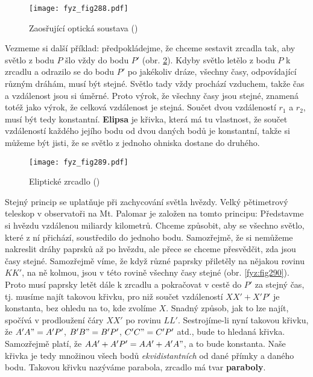     \begin{figure}[ht!] %
      \centering
      \texttt{[image: fyz\_fig288.pdf]}
      \caption{Zaosřující optická soustava
               (\cite[s.~351]{Feynman01})}
      \label{fyz:fig288}
    \end{figure}

    Vezmeme si další příklad: předpokládejme, že chceme sestavit zrcadla tak, aby světlo z bodu 
    \(P\) šlo vždy do bodu \(P'\) (obr. \ref{fyz:fig289}). Kdyby světlo letělo z bodu \(P\) k 
    zrcadlu a odrazilo se do bodu \(P'\) po jakékoliv dráze, všechny časy, odpovídající různým 
    dráhám, musí být stejné. Světlo tady vždy prochází vzduchem, takže čas a vzdálenost jsou si 
    úměrné. Proto výrok, že všechny časy jsou stejné, znamená totéž jako výrok, že celková 
    vzdálenost je stejná. Součet dvou vzdáleností \(r_1\) a \(r_2\), musí být tedy konstantní. 
    \textbf{Elipsa} je křivka, která má tu vlastnost, že součet vzdáleností každého jejího bodu od 
    dvou daných bodů je konstantní, takže si můžeme být jisti, že se světlo z jednoho ohniska 
    dostane do druhého.
    
    \begin{figure}[ht!] %
      \centering
      \texttt{[image: fyz\_fig289.pdf]}
      \caption{Eliptické zrcadlo
               (\cite[s.~351]{Feynman01})}
      \label{fyz:fig289}
    \end{figure}

    Stejný princip se uplatňuje při zachycování světla hvězdy. Velký pětimetrový teleskop v 
    observatoři na Mt. Palomar je založen na tomto principu: Představme si hvězdu vzdálenou 
    miliardy kilometrů. Chceme způsobit, aby se všechno světlo, které z ní přichází, soustředilo do 
    jednoho bodu. Samozřejmě, že si nemůžeme nakreslit dráhy paprsků až po hvězdu, ale přece se 
    chceme přesvědčit, zda jsou časy stejné. Samozřejmě víme, že když různé paprsky přiletěly na 
    nějakou rovinu \(KK'\), na ně kolmou, jsou v této rovině všechny časy stejné (obr. 
    \ref{fyz:fig290}). Proto musí paprsky letět dále k zrcadlu a pokračovat v cestě do \(P'\) za 
    stejný čas, tj. musíme najít takovou křivku, pro niž součet vzdáleností \(XX' + X'P'\) je 
    konstanta, bez ohledu na to, kde zvolíme \(X\). Snadný způsob, jak to lze najít, spočívá v 
    prodloužení čáry \(XX'\) po rovinu \(LL'\). Sestrojíme-li nyní takovou křivku, že \(A'A" = 
    A'P'\), \(B'B" = B'P'\), \(C'C" = C'P'\) atd., bude to hledaná křivka. Samozřejmě platí, že 
    \(AA' + A'P' = AA' + A'A"\), a to bude konstanta. Naše křivka je tedy množinou všech bodů 
    \emph{ekvidistantních} od dané přímky a daného bodu. Takovou křivku nazýváme parabola, zrcadlo 
    má tvar \textbf{paraboly}.

